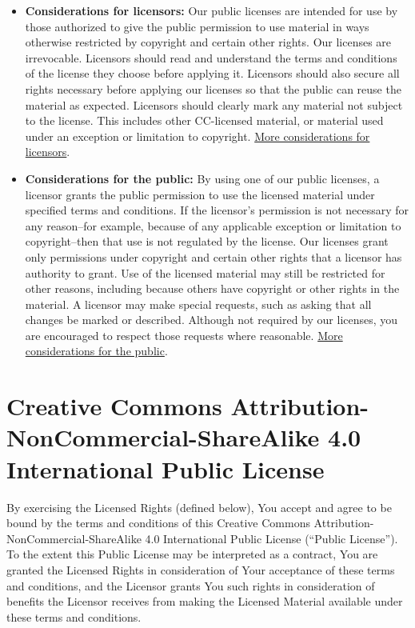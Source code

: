 \documentclass[]{book}
\begin{document}
\begin{itemize}
\item
  \textbf{Considerations for licensors:} Our public licenses are
  intended for use by those authorized to give the public permission to
  use material in ways otherwise restricted by copyright and certain
  other rights. Our licenses are irrevocable. Licensors should read and
  understand the terms and conditions of the license they choose before
  applying it. Licensors should also secure all rights necessary before
  applying our licenses so that the public can reuse the material as
  expected. Licensors should clearly mark any material not subject to
  the license. This includes other CC-licensed material, or material
  used under an exception or limitation to copyright.
  \href{http://wiki.creativecommons.org/Considerations_for_licensors_and_licensees\#Considerations_for_licensors}{More
  considerations for licensors}.
\item
  \textbf{Considerations for the public:} By using one of our public
  licenses, a licensor grants the public permission to use the licensed
  material under specified terms and conditions. If the licensor's
  permission is not necessary for any reason--for example, because of
  any applicable exception or limitation to copyright--then that use is
  not regulated by the license. Our licenses grant only permissions
  under copyright and certain other rights that a licensor has authority
  to grant. Use of the licensed material may still be restricted for
  other reasons, including because others have copyright or other rights
  in the material. A licensor may make special requests, such as asking
  that all changes be marked or described. Although not required by our
  licenses, you are encouraged to respect those requests where
  reasonable.
  \href{http://wiki.creativecommons.org/Considerations_for_licensors_and_licensees\#Considerations_for_licensees}{More
  considerations for the public}.
\end{itemize}

\section{Creative Commons Attribution-NonCommercial-ShareAlike 4.0
International Public
License}\label{creative-commons-attribution-noncommercial-sharealike-4.0-international-public-license}

By exercising the Licensed Rights (defined below), You accept and agree
to be bound by the terms and conditions of this Creative Commons
Attribution-NonCommercial-ShareAlike 4.0 International Public License
(``Public License''). To the extent this Public License may be
interpreted as a contract, You are granted the Licensed Rights in
consideration of Your acceptance of these terms and conditions, and the
Licensor grants You such rights in consideration of benefits the
Licensor receives from making the Licensed Material available under
these terms and conditions.
\end{document}
